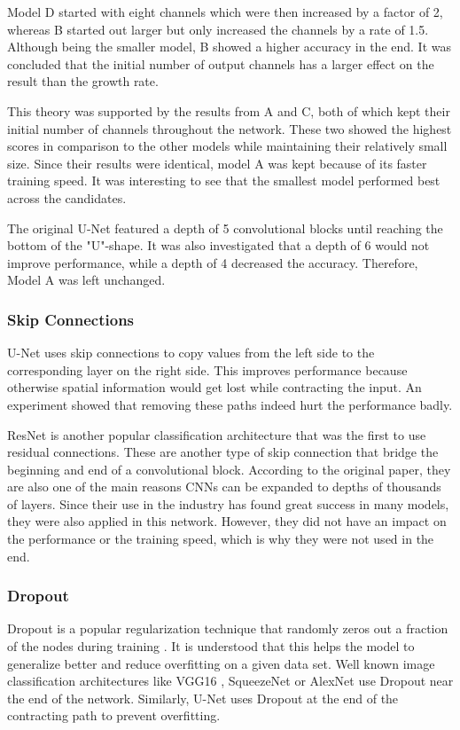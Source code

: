 Model D started with eight channels which were then increased by a factor of 2, whereas B started out larger but only increased the channels by a rate of 1.5. Although being the smaller model, B showed a higher accuracy in the end. It was concluded that the initial number of output channels has a larger effect on the result than the growth rate.

This theory was supported by the results from A and C, both of which kept their initial number of channels throughout the network. These two showed the highest scores in comparison to the other models while maintaining their relatively small size. Since their results were identical, model A was kept because of its faster training speed. It was interesting to see that the smallest model performed best across the candidates.

The original U-Net featured a depth of 5 convolutional blocks until reaching the bottom of the "U"-shape. It was also investigated that a depth of 6 would not improve performance, while a depth of 4 decreased the accuracy. Therefore, Model A was left unchanged.

\subsubsection{Skip Connections}

U-Net uses skip connections to copy values from the left side to the corresponding layer on the right side. This improves performance because otherwise spatial information would get lost while contracting the input. An experiment showed that removing these paths indeed hurt the performance badly.

ResNet \cite{He2015b} is another popular classification architecture that was the first to use residual connections. These are another type of skip connection that bridge the beginning and end of a convolutional block. According to the original paper, they are also one of the main reasons CNNs can be expanded to depths of thousands of layers. Since their use in the industry has found great success in many models, they were also applied in this network. However, they did not have an impact on the performance or the training speed, which is why they were not used in the end.

\subsubsection{Dropout}

Dropout is a popular regularization technique that randomly zeros out a fraction of the nodes during training \cite{Srivastava2014}. It is understood that this helps the model to generalize better and reduce overfitting on a given data set. Well known image classification architectures like VGG16 \cite{Simonyan2014a}, SqueezeNet \cite{Iandola2016a} or AlexNet \cite{Krizhevsky} use Dropout near the end of the network. Similarly, U-Net uses Dropout at the end of the contracting path to prevent overfitting.

